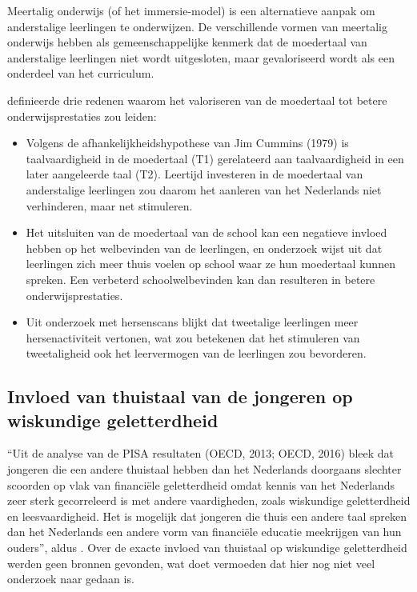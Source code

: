 \documentclass{hogent-article}
\begin{document}
Meertalig onderwijs (of het immersie-model) is een alternatieve aanpak om anderstalige leerlingen te onderwijzen. De verschillende vormen van meertalig onderwijs hebben als gemeenschappelijke kenmerk dat de moedertaal van anderstalige leerlingen niet wordt uitgesloten, maar gevaloriseerd wordt als een onderdeel van het curriculum.

\textcite{Agirdag2014} definieerde drie redenen waarom het valoriseren van de moedertaal tot betere onderwijsprestaties zou leiden:
\begin{itemize}
    \item Volgens de afhankelijkheidshypothese van Jim Cummins (1979) is taalvaardigheid in de moedertaal (T1) gerelateerd aan taalvaardigheid in een later aangeleerde taal (T2). Leertijd investeren in de moedertaal van anderstalige leerlingen zou daarom het aanleren van het Nederlands niet verhinderen, maar net stimuleren.

    \item Het uitsluiten van de moedertaal van de school kan een negatieve invloed hebben op het welbevinden van de leerlingen, en onderzoek wijst uit dat leerlingen zich meer thuis voelen op school waar ze hun moedertaal kunnen spreken. Een verbeterd schoolwelbevinden kan dan resulteren in betere onderwijsprestaties.

    \item Uit onderzoek met hersenscans blijkt dat tweetalige leerlingen meer hersenactiviteit vertonen, wat zou betekenen dat het stimuleren van tweetaligheid ook het leervermogen van de leerlingen zou bevorderen.
\end{itemize}

\subsection*{Invloed van thuistaal van de jongeren op wiskundige geletterdheid}

\enquote{Uit de analyse van de PISA resultaten (OECD, 2013; OECD, 2016) bleek dat jongeren die een andere thuistaal hebben dan het Nederlands doorgaans slechter scoorden op vlak van financiële geletterdheid omdat kennis van het Nederlands zeer sterk gecorreleerd is met andere vaardigheden, zoals wiskundige geletterdheid en leesvaardigheid. Het is mogelijk dat jongeren die thuis een andere taal spreken dan het Nederlands een andere vorm van financiële educatie meekrijgen van hun ouders}, aldus \textcite{Cooreman2018}. Over de exacte invloed van thuistaal op wiskundige geletterdheid werden geen bronnen gevonden, wat doet vermoeden dat hier nog niet veel onderzoek naar gedaan is.
\end{document}
